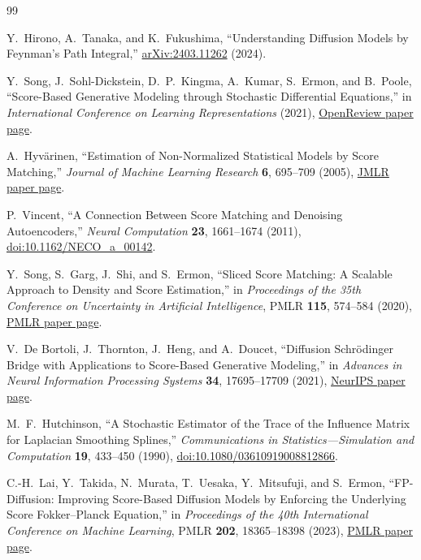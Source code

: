 \documentclass[11pt]{article}
\begin{document}
\begin{thebibliography}{99}

Y.~Hirono, A.~Tanaka, and K.~Fukushima,
``Understanding Diffusion Models by Feynman's Path Integral,''
\href{https://arxiv.org/abs/2403.11262}{arXiv:2403.11262} (2024).

Y.~Song, J.~Sohl-Dickstein, D.~P.~Kingma, A.~Kumar, S.~Ermon, and B.~Poole,
``Score-Based Generative Modeling through Stochastic Differential Equations,''
in \emph{International Conference on Learning Representations} (2021),
\href{https://openreview.net/forum?id=PxTIG12RRHS}{OpenReview paper page}.

A.~Hyv\"arinen,
``Estimation of Non-Normalized Statistical Models by Score Matching,''
\emph{Journal of Machine Learning Research} \textbf{6}, 695--709 (2005),
\href{https://www.jmlr.org/papers/v6/hyvarinen05a.html}{JMLR paper page}.

P.~Vincent,
``A Connection Between Score Matching and Denoising Autoencoders,''
\emph{Neural Computation} \textbf{23}, 1661--1674 (2011),
\href{https://doi.org/10.1162/NECO_a_00142}{doi:10.1162/NECO\_a\_00142}.

Y.~Song, S.~Garg, J.~Shi, and S.~Ermon,
``Sliced Score Matching: A Scalable Approach to Density and Score Estimation,''
in \emph{Proceedings of the 35th Conference on Uncertainty in Artificial
Intelligence}, PMLR \textbf{115}, 574--584 (2020),
\href{https://proceedings.mlr.press/v115/song20a.html}{PMLR paper page}.

V.~De Bortoli, J.~Thornton, J.~Heng, and A.~Doucet,
``Diffusion Schr\"odinger Bridge with Applications to Score-Based Generative
Modeling,'' in \emph{Advances in Neural Information Processing Systems}
\textbf{34}, 17695--17709 (2021),
\href{https://proceedings.neurips.cc/paper/2021/hash/940392f5f32a7ade1cc201767cf83e31-Abstract.html}{NeurIPS paper page}.

M.~F.~Hutchinson,
``A Stochastic Estimator of the Trace of the Influence Matrix for Laplacian
Smoothing Splines,'' \emph{Communications in Statistics---Simulation and
Computation} \textbf{19}, 433--450 (1990),
\href{https://doi.org/10.1080/03610919008812866}{doi:10.1080/03610919008812866}.

C.-H.~Lai, Y.~Takida, N.~Murata, T.~Uesaka, Y.~Mitsufuji, and S.~Ermon,
``FP-Diffusion: Improving Score-Based Diffusion Models by Enforcing the
Underlying Score Fokker--Planck Equation,'' in \emph{Proceedings of the 40th
International Conference on Machine Learning}, PMLR \textbf{202},
18365--18398 (2023),
\href{https://proceedings.mlr.press/v202/lai23d.html}{PMLR paper page}.


\end{thebibliography}
\end{document}
